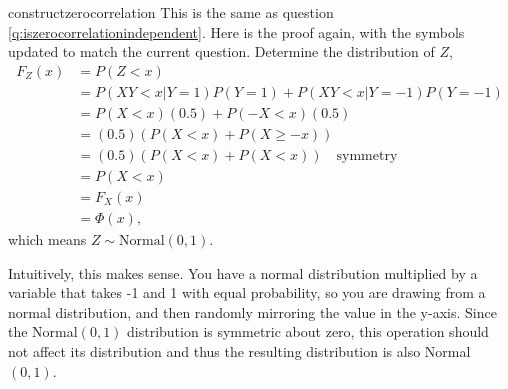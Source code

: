 \begin{answer}{constructzerocorrelation}
This is the same as question \ref{q:iszerocorrelationindependent}.
Here is the proof again, with the symbols updated to match the current question.
Determine the distribution of $Z$,
\begin{align*}
F_Z(x)  &= P(Z<x)  \\
&=
P( XY<x| Y = 1)P(Y=1) +
P( XY<x| Y = -1)P(Y=-1) \\
&=
P( X<x)(0.5) + P(-X<x)(0.5) \\
&=  (0.5)( P( X<x) + P(X \geq -x)) \\
&=  (0.5)( P( X<x) + P(X < x)) \quad \text{symmetry} \\
&=   P(X < x) \\
&=   F_X(x) \\
&=   \Phi(x)
\text{,}
\end{align*}
which means $Z \sim \text{Normal}(0, 1)$.

Intuitively, this makes sense.
You have a normal distribution multiplied by a variable that takes -1 and 1 with equal probability,
so you are drawing from a normal distribution, and then randomly mirroring the value in the y-axis.
Since the Normal$(0,1)$ distribution is symmetric about zero, this operation should not affect its distribution and thus the resulting distribution is also Normal$(0,1)$.


\end{answer}
